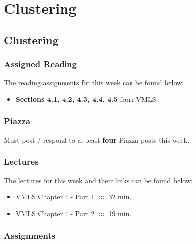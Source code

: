 \clearpage

\renewcommand{\ChapTitle}{Clustering}
\renewcommand{\SectionTitle}{Clustering}

\chapter{\ChapTitle}
\section{\SectionTitle}

\subsection{Assigned Reading}

The reading assignments for this week can be found below:

\begin{itemize}
    \item \textbf{Sections 4.1, 4.2, 4.3, 4.4, 4.5} from VMLS.
\end{itemize}

\subsection{Piazza}

Must post / respond to at least \textbf{four} Piazza posts this week.  

\subsection{Lectures}

The lectures for this week and their links can be found below:

\begin{itemize}
    \item \href{https://www.youtube.com/watch?v=liaZ_SCuE1w&list=PLoROMvodv4rMz-WbFQtNUsUElIh2cPmN9&index=14}{VMLS Chapter 4 - Part 1} $\approx$ 32 min.
    \item \href{https://www.youtube.com/watch?v=a4GjONqojzM&list=PLoROMvodv4rMz-WbFQtNUsUElIh2cPmN9&index=15}{VMLS Chapter 4 - Part 2} $\approx$ 19 min.
\end{itemize}

\subsection{Assignments}


